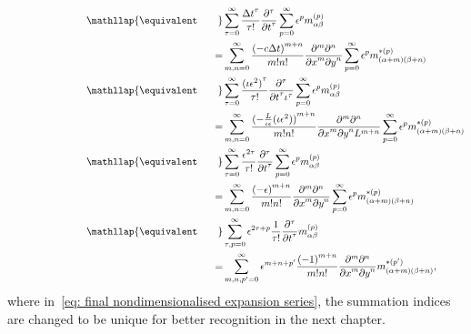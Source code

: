 \begin{align}
  \phantom{\equivalent\qquad}
  &\begin{aligned}
  \nonumber
    \mathllap{\equivalent\qquad} & \sum_{\tau = 0}^\infty \frac{{\Delta t}^\tau }{\tau!}  \frac{\partial^\tau}{{\partial t}^\tau} \sum_{p=0}^{\infty} \epsilon^p m_{\alpha\beta}^{(p)} \\
    = &{}\sum_{m,n = 0}^\infty \frac{{(-c\Delta t)}^{m+n}} {m!n!} \frac{\partial^m \partial^n}{ {\partial x}^m{\partial y}^n} \sum_{p=0}^{\infty} \epsilon^p m_{(\alpha + m)(\beta + n)}^{*(p)}
  \end{aligned}\\
  &\begin{aligned}
    \label{eq: nondimensionalised expansion series}
    \mathllap{\equivalent\qquad} &
    \sum_{\tau = 0}^\infty \frac{{(\iota\epsilon^2)}^\tau }{\tau!} \frac{\partial^\tau}{{\partial t}^\tau \iota^\tau} \sum_{p=0}^{\infty} \epsilon^p m_{\alpha\beta}^{(p)} \\
    = &{}\sum_{m,n = 0}^\infty \frac{{(-\frac{L}{\iota\epsilon}(\iota\epsilon^2))}^{m+n}} {m!n!}
    \frac{\partial^m \partial^n}{ {\partial x}^m{\partial y}^n L^{m+n}} \sum_{p=0}^{\infty} \epsilon^p m_{(\alpha + m)(\beta + n)}^{*(p)}
  \end{aligned} \\
  &\begin{aligned}
  \nonumber
    \mathllap{\equivalent\qquad} &
    \sum_{\tau = 0}^\infty \frac{\epsilon^{2\tau} }{\tau!} \frac{\partial^\tau}{{\partial t}^\tau} \sum_{p=0}^{\infty} \epsilon^p m_{\alpha\beta}^{(p)} \\
    = &{}\sum_{m,n = 0}^\infty \frac{{(-\epsilon)}^{m+n}} {m!n!}
    \frac{\partial^m \partial^n}{ {\partial x}^m{\partial y}^n } \sum_{p=0}^{\infty} \epsilon^p m_{(\alpha + m)(\beta + n)}^{*(p)}
  \end{aligned} \\
  &\begin{aligned}
    \label{eq: final nondimensionalised expansion series}
    \mathllap{\equivalent\qquad} &
    \sum_{\tau, p = 0}^\infty\epsilon^{2\tau + p} \frac{1} {\tau!} \frac{\partial^\tau}{{\partial t}^\tau} m_{\alpha\beta}^{(p)} \\
    = &{} \sum_{m,n,p' = 0}^\infty  \epsilon^{m+n+p'} \frac{{(-1)}^{m+n}} {m!n!}
    \frac{\partial^m \partial^n}{ {\partial x}^m{\partial y}^n } m_{(\alpha + m)(\beta + n)}^{*(p')},
  \end{aligned}
\end{align}
where in~\eqref{eq: final nondimensionalised expansion series}, the summation indices are changed to be unique for better recognition in the next chapter.

